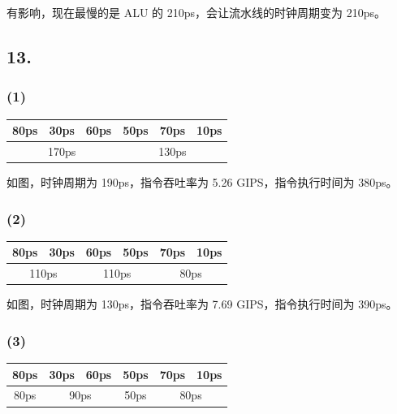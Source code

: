 \documentclass[12pt, a4paper]{ctexart}
\begin{document}
有影响，现在最慢的是 ALU 的 210ps，会让流水线的时钟周期变为 210ps。

\subsection*{13.}

\subsubsection*{(1)}

\begin{table}[H]
    \centering
    \begin{tabular}{|ccc|ccc|}
        \hline
        80ps & 30ps & 60ps & 50ps & 70ps & 10ps \\ \hline
        \multicolumn{3}{|c|}{170ps} & \multicolumn{3}{|c|}{130ps} \\ \hline
    \end{tabular}
\end{table}

如图，时钟周期为 190ps，指令吞吐率为 5.26 GIPS，指令执行时间为 380ps。

\subsubsection*{(2)}

\begin{table}[H]
    \centering
    \begin{tabular}{|cc|cc|cc|}
        \hline
        80ps & 30ps & 60ps & 50ps & 70ps & 10ps \\ \hline
        \multicolumn{2}{|c|}{110ps} & \multicolumn{2}{|c|}{110ps} &
        \multicolumn{2}{|c|}{80ps} \\ \hline
    \end{tabular}
\end{table}

如图，时钟周期为 130ps，指令吞吐率为 7.69 GIPS，指令执行时间为 390ps。

\subsubsection*{(3)}

\begin{table}[H]
    \centering
    \begin{tabular}{|c|cc|c|cc|}
        \hline
        80ps & 30ps & 60ps & 50ps & 70ps & 10ps \\ \hline
        \multicolumn{1}{|c|}{80ps} & \multicolumn{2}{|c|}{90ps} &
        \multicolumn{1}{|c|}{50ps} & \multicolumn{2}{|c|}{80ps} \\ \hline
    \end{tabular}
\end{table}
\end{document}
